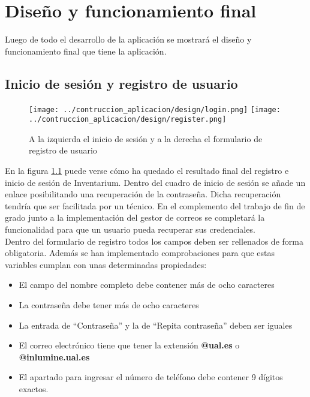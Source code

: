 \chapter{Diseño y funcionamiento final}
Luego de todo el desarrollo de la aplicación se mostrará el diseño y funcionamiento final que tiene la aplicación.

\section{Inicio de sesión y registro de usuario}
\begin{figure}[ht]
    \centering
    \texttt{[image: ../contruccion\_aplicacion/design/login.png]}
    \texttt{[image: ../contruccion\_aplicacion/design/register.png]}
    \caption{A la izquierda el inicio de sesión y a la derecha el formulario de registro de usuario}\label{fig:register-and-login}
\end{figure}
En la figura \ref{fig:register-and-login} puede verse cómo ha quedado el resultado final del registro e inicio de sesión de Inventarium. Dentro del cuadro de inicio de sesión se añade un enlace posibilitando una recuperación de la contraseña. Dicha recuperación tendría que ser facilitada por un técnico. En el complemento del trabajo de fin de grado junto a la implementación del gestor de correos se completará la funcionalidad para que un usuario pueda recuperar sus credenciales.
\\Dentro del formulario de registro todos los campos deben ser rellenados de forma obligatoria. Además se han implementado comprobaciones para que estas variables cumplan con unas determinadas propiedades:
\begin{itemize}
    \item El campo del nombre completo debe contener más de ocho caracteres
    \item La contraseña debe tener más de ocho caracteres
    \item La entrada de ``Contraseña'' y la de ``Repita contraseña'' deben ser iguales
    \item El correo electrónico tiene que tener la extensión \textbf{@ual.es} o \textbf{@inlumine.ual.es}
    \item El apartado para ingresar el número de teléfono debe contener 9 dígitos exactos.
\end{itemize}

